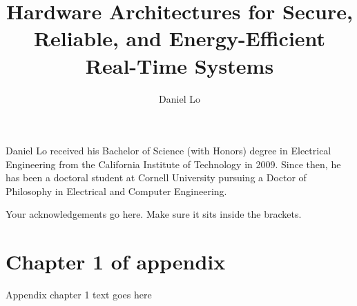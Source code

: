 \documentclass[phd,tocprelim]{cornell}
\title {Hardware Architectures for Secure, Reliable, and Energy-Efficient Real-Time Systems}
\author {Daniel Lo}
\begin{document}
\maketitle
\makecopyright

\begin{abstract}

\end{abstract}

\begin{biosketch}
Daniel Lo received his Bachelor of Science (with Honors) degree in Electrical
Engineering from the California Institute of Technology in 2009. Since then, he
has been a doctoral student at Cornell University pursuing a Doctor of
Philosophy in Electrical and Computer Engineering.
\end{biosketch}


\begin{acknowledgements}
Your acknowledgements go here. Make sure it sits inside the brackets.
\end{acknowledgements}

\contentspage
\tablelistpage
\figurelistpage

\normalspacing \setcounter{page}{1} 
\pagestyle{cornell} \addtolength{\parskip}{0.5\baselineskip}









\appendix
\chapter{Chapter 1 of appendix}
Appendix chapter 1 text goes here


\end{document}
